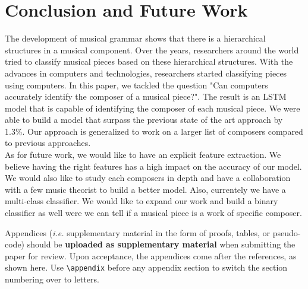 \documentclass[11pt,a4paper]{article}
\begin{document}
\section{Conclusion and Future Work}

The development of musical grammar shows that there is a hierarchical structures in a musical component. Over the years, researchers around the world tried to classify musical pieces based on these hierarchical structures. With the advances in computers and technologies, researchers started classifying pieces using computers. In this paper, we tackled the question "Can computers accurately identify the composer of a musical piece?". The result is an LSTM model that is capable of identifying the composer of each musical piece. We were able to build a model that surpass the previous state of the art approach by 1.3\%. Our approach is generalized to work on a larger list of composers compared to previous approaches. \\ 
As for future work, we would like to have an explicit feature extraction. We believe having the right features has a high impact on the accuracy of our model. We would also like to study each composers in depth and have a collaboration with a few music theorist to build a better model. Also, currentely we have a multi-class classifier. We would like to expand our work and build a binary classifier as well were we can tell if a musical piece is a work of specific composer. 






\appendix



Appendices ({\em i.e.} supplementary material in the form of proofs, tables,
or pseudo-code) should be {\bf uploaded as supplementary material} when submitting the paper for review.
Upon acceptance, the appendices come after the references, as shown here. Use
\verb|\appendix| before any appendix section to switch the section
numbering over to letters.
\end{document}
